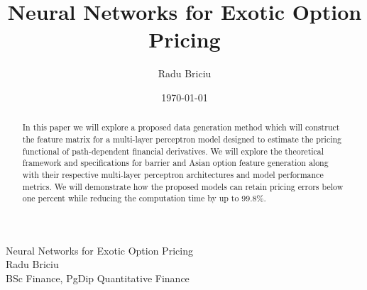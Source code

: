 \documentclass[11pt]{article}
\title{Neural Networks for Exotic Option Pricing}
\author{Radu Briciu}
\date{\today}
\begin{document}
\begin{titlepage}
	\vfill
	\begin{center}
		\Large Neural Networks for Exotic Option Pricing \\ \vspace{1em}
		\small Radu Briciu \\ \tiny BSc Finance, PgDip Quantitative Finance
	\end{center}
	\vfill
	\begin{abstract}
	\noindent
	In this paper we will explore a proposed data generation method which will construct the feature matrix for a multi-layer perceptron model designed to estimate the pricing functional of path-dependent financial derivatives. We will explore the theoretical framework and specifications for barrier and Asian option feature generation along with their respective multi-layer perceptron architectures and model performance metrics. We will demonstrate how the proposed models can retain pricing errors below one percent while reducing the computation time by up to 99.8\%.
	\end{abstract}
	\vfill
	\thispagestyle{empty}
	\vfill
	\begingroup
	\small
	\tableofcontents
	\endgroup
\end{titlepage}

\clearpage
{}
\end{document}
